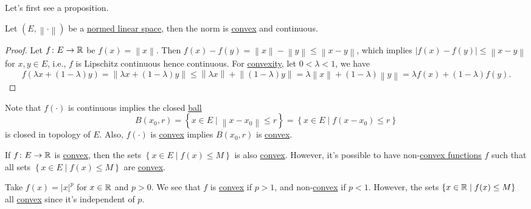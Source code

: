 Let's first see a proposition.

\begin{proposition}
	Let \((E, \left\lVert \cdot\right\rVert)\) be a \hyperref[def:normed-vector-space]{normed linear space}, then the norm is \hyperref[def:convex-function]{convex} and continuous.
\end{proposition}
\begin{proof}
	Let \(f\colon E\to \mathbb{\MakeUppercase{r}} \) be \(f(x) = \left\lVert x\right\rVert \). Then \(f(x) - f(y) = \left\lVert x\right\rVert - \left\lVert y\right\rVert  \leq \left\lVert x-y\right\rVert\), which implies \(\left\vert f(x) - f(y) \right\vert \leq \left\lVert x-y\right\rVert \) for \(x, y\in E\), i.e., \(f\) is Lipschitz continuous hence continuous. For \hyperref[def:convex-function]{convexity}, let \(0 < \lambda < 1\), we have
	\[
		f(\lambda x+(1-\lambda )y) = \left\lVert \lambda x + (1-\lambda )y\right\rVert \leq \left\lVert \lambda x\right\rVert + \left\lVert (1-\lambda )y\right\rVert = \lambda \left\lVert x\right\rVert + (1-\lambda )\left\lVert y\right\rVert  = \lambda f(x) + (1-\lambda )f(y).
	\]
\end{proof}

\begin{note}
	Note that \(f(\cdot)\) is continuous implies the closed \hyperref[def:ball]{ball}
	\[
		B(x_0, r) = \left\{ x\in E\mid \left\lVert x-x_0\right\rVert\leq r\right\} = \left\{ x\in E\mid f(x-x_0)\leq r \right\}
	\]
	is closed in topology of \(E\). Also, \(f(\cdot)\) is \hyperref[def:convex-function]{convex} implies \(B(x_0, r)\) is \hyperref[def:convex-set]{convex}.
\end{note}

\begin{remark}
	If \(f\colon E\to \mathbb{\MakeUppercase{r}} \) is \hyperref[def:convex-function]{convex}, then the sets \(\left\{ x\in E\mid f(x) \leq M \right\}\) is also \hyperref[def:convex-set]{convex}. However, it's possible to have non-\hyperref[def:convex-function]{convex functions} \(f\) such that all sets \(\left\{ x\in E \mid f(x) \leq M \right\} \) are \hyperref[def:convex-set]{convex}.
\end{remark}
\begin{explanation}
	Take \(f(x) = \left\vert x \right\vert ^p\) for \(x\in \mathbb{\MakeUppercase{r}} \) and \(p > 0\). We see that \(f\) is \hyperref[def:convex-function]{convex} if \(p>1\), and non-\hyperref[def:convex-function]{convex} if \(p<1\). However, the sets \(\left\{ x\in \mathbb{\MakeUppercase{R}} \mid f(x) \leq M \right\} \) all \hyperref[def:convex-set]{convex} since it's independent of \(p\).
\end{explanation}

